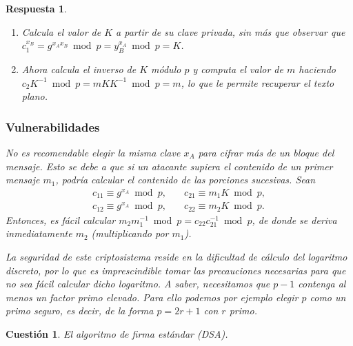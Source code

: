 \documentclass[
  a4paper,
  spanish,
  12pt,
]{scrartcl}
\theoremstyle{ejercicio-style}
\newtheorem{ejer}{Cuestión}
\theoremstyle{remark-style}
\newtheorem*{sol}{Respuesta}
\theoremstyle{teorema-style}
\begin{document}
\begin{sol}
\begin{enumerate}
  \item Calcula el valor de $K$ a partir de su clave privada, sin más que observar que $c_1^{x_B} = g^{x_Ax_B} \bmod p = y_B^{x_A} \bmod p = K$.
  \item Ahora calcula el inverso de $K$ módulo $p$ y computa el valor de $m$ haciendo $c_2K^{-1} \bmod p = mKK^{-1} \bmod p = m$, lo que le permite recuperar el texto plano.
\end{enumerate}

\subsubsection*{Vulnerabilidades}

No es recomendable elegir la misma clave $x_A$ para cifrar más de un bloque del mensaje. Esto se debe a que si un atacante supiera el contenido de un primer mensaje \(m_{1}\), podría calcular el contenido de las porciones sucesivas. Sean
\begin{align*}
c_{11}\equiv g^{x_{A}} \bmod{p}, \quad& c_{21}\equiv m_{1}K\bmod{p}, \\
c_{12}\equiv g^{x_{A}} \bmod{p}, \quad& c_{22}\equiv m_{2}K\bmod{p}.
\end{align*}
Entonces, es fácil calcular \(m_2m_1^{-1} \bmod p = c_{22}c_{21}^{-1} \bmod{p}\), de donde se deriva inmediatamente \(m_{2}\) (multiplicando por \(m_{1}\)).

La seguridad de este criptosistema reside en la dificultad de cálculo del logaritmo discreto, por lo que es imprescindible tomar las precauciones necesarias para que no sea fácil calcular dicho logaritmo. A saber, necesitamos que $p-1$ contenga al menos un factor primo elevado. Para ello podemos por ejemplo elegir $p$ como un \textit{primo seguro}, es decir, de la forma $p = 2r + 1$ con $r$ primo.
\end{sol}

\begin{ejer}
  El algoritmo de firma estándar (DSA).
\end{ejer}
\end{document}

